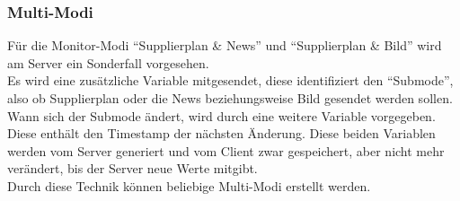 \subsubsection{Multi-Modi}
Für die Monitor-Modi \enquote{Supplierplan \& News} und \enquote{Supplierplan \& Bild} wird am Server ein Sonderfall vorgesehen.\\
Es wird eine zusätzliche Variable mitgesendet, diese identifiziert den \enquote{Submode}, also ob Supplierplan oder die News beziehungsweise Bild gesendet werden sollen. Wann sich der Submode ändert, wird durch eine weitere Variable vorgegeben. Diese enthält den Timestamp der nächsten Änderung. Diese beiden Variablen werden vom Server generiert und vom Client zwar gespeichert, aber nicht mehr verändert, bis der Server neue Werte mitgibt.\\
Durch diese Technik können beliebige Multi-Modi erstellt werden.